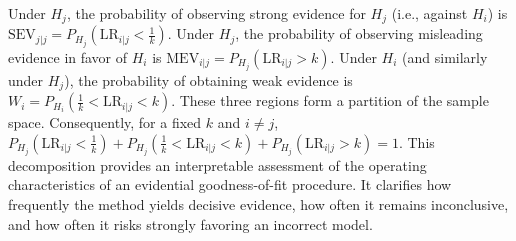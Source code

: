 \documentclass[twoside]{article}
\begin{document}
 Under \(H_j\), the probability of observing strong evidence for \(H_j\) (i.e., against \(H_i\)) is
$
\mathrm{SEV}_{j|j}=P_{H_j}\!\left(\mathrm{LR}_{i|j}<\frac{1}{k}\right).
$
Under \(H_j\), the probability of observing misleading evidence in favor of \(H_i\) is
$
\mathrm{MEV}_{i|j}=P_{H_j}\!\left(\mathrm{LR}_{i|j}>k\right).
$
 Under \(H_i\) (and similarly under \(H_j\)), the probability of obtaining weak evidence is
$
W_i=P_{H_i}\!\left(\frac{1}{k}<\mathrm{LR}_{i|j}<k\right).
$
These three regions form a partition of the sample space. Consequently, for a fixed \(k\) and \(i\neq j\),
$
P_{H_j}\!\left(\mathrm{LR}_{i|j}<\frac{1}{k}\right)
+
P_{H_j}\!\left(\frac{1}{k}<\mathrm{LR}_{i|j}<k\right)
+
P_{H_j}\!\left(\mathrm{LR}_{i|j}>k\right)
=1.
$
This decomposition provides an interpretable assessment of the operating characteristics of an evidential goodness-of-fit procedure. It clarifies how frequently the method yields decisive evidence, how often it remains inconclusive, and how often it risks strongly favoring an incorrect model.
\end{document}
